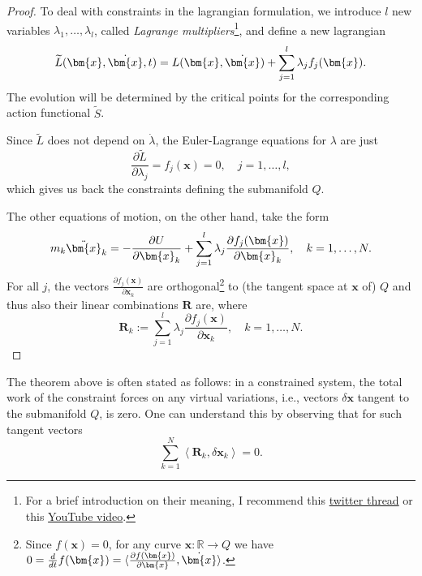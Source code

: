 \documentclass[english,fontsize=11pt,paper=a5,oneside]{scrbook}
\newcommand{\R}{\mathbb{R}}
\newcommand{\bx}{\bm{x}}
\newcommand{\lag}{\langle}
\newcommand{\rag}{\rangle}
\theoremstyle{definition}
\newenvironment{remark}
  {\pushQED{\qed}\renewcommand{\qedsymbol}{$\lozenge$}\remarkx}
  {\popQED\endremarkx}
\begin{document}
\begin{proof}
  To deal with constraints in the lagrangian formulation, we introduce $l$ new variables $\lambda_1, \ldots, \lambda_l$, called \emph{Lagrange multipliers}\footnote{For a brief introduction on their meaning, I recommend this \href{https://twitter.com/j\_bertolotti/status/1569324058633801729}{twitter thread} or this \href{https://www.youtube.com/watch?v=5A39Ht9Wcu0}{YouTube video}.}, and define a new lagrangian
  \begin{equation}
    \widetilde L(\bx, \dot\bx, t) = L(\bx, \dot\bx) + \sum_{j=1}^l \lambda_j f_j(\bx).
  \end{equation}
  The evolution will be determined by the critical points for the corresponding action functional $\widetilde S$.

  Since $\widetilde L$ does not depend on $\dot\lambda$, the Euler-Lagrange equations for $\lambda$ are just
  \begin{equation}
    \frac{\partial \widetilde L}{\partial \lambda_j} = f_j(\bx) = 0,\quad j=1,\ldots,l,
  \end{equation}
  which gives us back the constraints defining the submanifold $Q$.

  The other equations of motion, on the other hand, take the form
  \begin{equation}\label{eq:newtconstr}
    m_k \ddot \bx_k = -\frac{\partial U}{\partial\bx_k} + \sum_{j=1}^l \lambda_j \frac{\partial f_j(\bx)}{\partial \bx_k},
    \quad k=1,\ldots,N.
  \end{equation}
  For all $j$, the vectors $\frac{\partial f_j(\bx)}{\partial \bx_k}$ are orthogonal\footnote{Since $f(\bx) = 0$, for any curve $\bx:\R\to Q$ we have $0 = \frac{d}{dt} f(\bx) = \lag \frac{\partial f(\bx)}{\partial \bx}, \dot\bx \rag$.} to (the tangent space at $\bx$ of) $Q$ and thus also their linear combinations $\bm{R}$ are, where
  \begin{equation}
    \bm{R}_k := \sum_{j=1}^l \lambda_j \frac{\partial f_j(\bx)}{\partial \bx_k},
    \quad k=1,\ldots,N.
  \end{equation}
\end{proof}

\begin{remark}
  The theorem above is often stated as follows: in a constrained system, the total work of the constraint forces on any virtual variations, i.e., vectors $\delta\bx$ tangent to the submanifold $Q$, is zero.
  One can understand this by observing that for such tangent vectors
  \begin{equation}\label{eq:orthogonalconstraint}
    \sum_{k=1}^N \left\lag\bm{R}_k, \delta\bx_k\right\rag = 0.
  \end{equation}
\end{remark}
\end{document}
